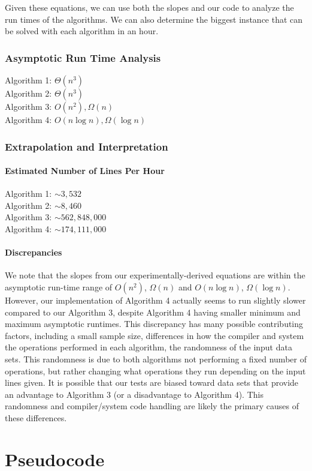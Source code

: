\documentclass{article}
\begin{document}
Given these equations, we can use both the slopes and our code to analyze the run times of the algorithms. We can also determine the biggest instance that can be solved with each algorithm in an hour.

\section*{Asymptotic Run Time Analysis}
Algorithm 1: $\Theta(n^3)$\\
Algorithm 2: $\Theta(n^3)$\\
Algorithm 3: $O(n^2), \Omega(n)$\\
Algorithm 4: $O(n\log n), \Omega(\log n)$\\

\section*{Extrapolation and Interpretation}
\subsection*{Estimated Number of Lines Per Hour}
Algorithm 1: $\sim 3,532$\\
Algorithm 2: $\sim 8,460$\\
Algorithm 3: $\sim 562,848,000$\\
Algorithm 4: $\sim 174,111,000$

\subsection*{Discrepancies}

We note that the slopes from our experimentally-derived equations are within the asymptotic run-time range of $O(n^2)$, $\Omega(n)$ and $O(n\log n)$, $\Omega(\log n)$.  However, our implementation of Algorithm 4 actually seems to run slightly slower compared to our Algorithm 3, despite Algorithm 4 having smaller minimum and maximum asymptotic runtimes.  This discrepancy has many possible contributing factors, including a small sample size, differences in how the compiler and system the operations performed in each algorithm, the randomness of the input data sets.  This randomness is due to both algorithms not performing a fixed number of operations, but rather changing what operations they run depending on the input lines given.  It is possible that our tests are biased toward data sets that provide an advantage to Algorithm 3 (or a disadvantage to Algorithm 4).  This randomness and compiler/system code handling are likely the primary causes of these differences.

\pagebreak

\part*{Pseudocode}

\end{document}
